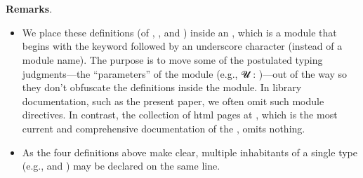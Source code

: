 \begin{code}
\AgdaSymbol{:}\AgdaSpace{}%
\AgdaSymbol{(}\AgdaSpace{}%
\AgdaSymbol{:}\AgdaSpace{}%
\AgdaSpace{}%
\AgdaSymbol{)}\AgdaSpace{}%
\AgdaSpace{}%
\AgdaSpace{}%
\AgdaSymbol{(}\AgdaSpace{}%
\AgdaSymbol{)}\<%
\\
%
\>[1]\AgdaSpace{}%
\AgdaSpace{}%
\AgdaOperator{\AgdaInductiveConstructor{,}}\AgdaSpace{}%
\AgdaSpace{}%
\AgdaSpace{}%
\AgdaSymbol{=}\AgdaSpace{}%
\<%
\\
%
\>[1]\AgdaSpace{}%
\AgdaSymbol{(}\AgdaSpace{}%
\AgdaOperator{\AgdaInductiveConstructor{,}}\AgdaSpace{}%
\AgdaSymbol{)}\AgdaSpace{}%
\AgdaSymbol{=}\AgdaSpace{}%
\<%
\end{code}
\ccpad
\textbf{Remarks}.
\begin{itemize}
\item We place these definitions (of , ,  and ) inside an , which is a module that begins with the  keyword followed by an underscore character (instead of a module name). The purpose is to move some of the postulated typing judgments---the ``parameters'' of the module (e.g., \ab 𝓤 \as : )---out of the way so they don't obfuscate the definitions inside the module.  In library documentation, such as the present paper, we often omit such module directives. In contrast, the collection of html pages at \ualibdotorg, which is the most current and comprehensive documentation of the \ualib, omits nothing.
\item As the four definitions above make clear, multiple inhabitants of a single type (e.g.,  and ) may be declared on the same line.
\end{itemize}
